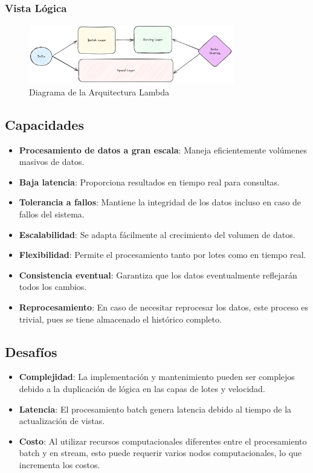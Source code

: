 \newpage
\subsubsection{Vista Lógica}
\begin{figure}[h]
\centering
\includegraphics[width=0.8\textwidth]{teorico/arquitecturas/lambda.png}
\caption{Diagrama de la Arquitectura Lambda}
\label{fig:arquitectura_lambda}
\end{figure}
\clearpage
\newpage

\subsection{Capacidades}
\begin{itemize}
\item \textbf{Procesamiento de datos a gran escala}: Maneja eficientemente volúmenes masivos de datos.
\item \textbf{Baja latencia}: Proporciona resultados en tiempo real para consultas.
\item \textbf{Tolerancia a fallos}: Mantiene la integridad de los datos incluso en caso de fallos del sistema.
\item \textbf{Escalabilidad}: Se adapta fácilmente al crecimiento del volumen de datos.
\item \textbf{Flexibilidad}: Permite el procesamiento tanto por lotes como en tiempo real.
\item \textbf{Consistencia eventual}: Garantiza que los datos eventualmente reflejarán todos los cambios.
\item \textbf{Reprocesamiento}: En caso de necesitar reprocesar los datos, este proceso es trivial, pues se tiene almacenado el histórico completo.
\end{itemize}

\subsection{Desafíos}
\begin{itemize}
\item \textbf{Complejidad}: La implementación y mantenimiento pueden ser complejos debido a la duplicación de lógica en las capas de lotes y velocidad.
\item \textbf{Latencia}: El procesamiento batch genera latencia debido al tiempo de la actualización de vistas.
\item \textbf{Costo}: Al utilizar recursos computacionales diferentes entre el procesamiento batch y en stream, esto puede requerir varios nodos computacionales, lo que incrementa los costos.
\end{itemize}
\newpage